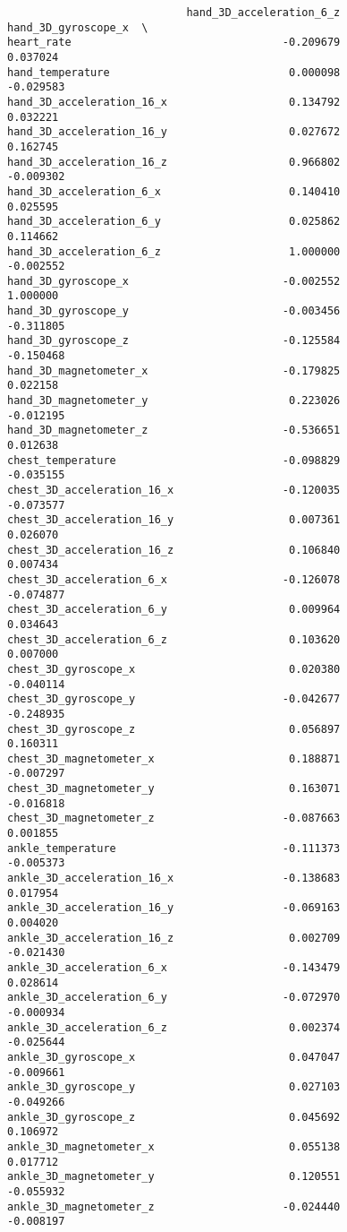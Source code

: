 \documentclass[11pt]{article}
\begin{document}
\begin{verbatim}
                            hand_3D_acceleration_6_z  hand_3D_gyroscope_x  \
heart_rate                                 -0.209679             0.037024   
hand_temperature                            0.000098            -0.029583   
hand_3D_acceleration_16_x                   0.134792             0.032221   
hand_3D_acceleration_16_y                   0.027672             0.162745   
hand_3D_acceleration_16_z                   0.966802            -0.009302   
hand_3D_acceleration_6_x                    0.140410             0.025595   
hand_3D_acceleration_6_y                    0.025862             0.114662   
hand_3D_acceleration_6_z                    1.000000            -0.002552   
hand_3D_gyroscope_x                        -0.002552             1.000000   
hand_3D_gyroscope_y                        -0.003456            -0.311805   
hand_3D_gyroscope_z                        -0.125584            -0.150468   
hand_3D_magnetometer_x                     -0.179825             0.022158   
hand_3D_magnetometer_y                      0.223026            -0.012195   
hand_3D_magnetometer_z                     -0.536651             0.012638   
chest_temperature                          -0.098829            -0.035155   
chest_3D_acceleration_16_x                 -0.120035            -0.073577   
chest_3D_acceleration_16_y                  0.007361             0.026070   
chest_3D_acceleration_16_z                  0.106840             0.007434   
chest_3D_acceleration_6_x                  -0.126078            -0.074877   
chest_3D_acceleration_6_y                   0.009964             0.034643   
chest_3D_acceleration_6_z                   0.103620             0.007000   
chest_3D_gyroscope_x                        0.020380            -0.040114   
chest_3D_gyroscope_y                       -0.042677            -0.248935   
chest_3D_gyroscope_z                        0.056897             0.160311   
chest_3D_magnetometer_x                     0.188871            -0.007297   
chest_3D_magnetometer_y                     0.163071            -0.016818   
chest_3D_magnetometer_z                    -0.087663             0.001855   
ankle_temperature                          -0.111373            -0.005373   
ankle_3D_acceleration_16_x                 -0.138683             0.017954   
ankle_3D_acceleration_16_y                 -0.069163             0.004020   
ankle_3D_acceleration_16_z                  0.002709            -0.021430   
ankle_3D_acceleration_6_x                  -0.143479             0.028614   
ankle_3D_acceleration_6_y                  -0.072970            -0.000934   
ankle_3D_acceleration_6_z                   0.002374            -0.025644   
ankle_3D_gyroscope_x                        0.047047            -0.009661   
ankle_3D_gyroscope_y                        0.027103            -0.049266   
ankle_3D_gyroscope_z                        0.045692             0.106972   
ankle_3D_magnetometer_x                     0.055138             0.017712   
ankle_3D_magnetometer_y                     0.120551            -0.055932   
ankle_3D_magnetometer_z                    -0.024440            -0.008197   


\end{verbatim}
\end{document}

